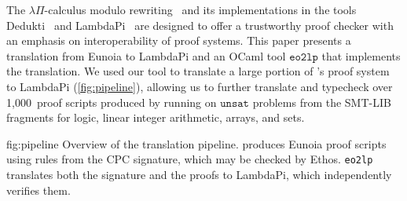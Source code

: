 \documentclass[class=llncs, crop=false]{standalone}
\begin{document}
The $\lambda\Pi$-calculus modulo rewriting~\cite{CousineauDowek}
and its implementations in the tools Dedukti~\cite{assaf2023dedukti}
and LambdaPi~\cite{hondet:hal-02981561} are designed to
offer a trustworthy proof checker with an emphasis on
interoperability of proof systems.
%
This paper presents a translation from Eunoia to LambdaPi
and an OCaml tool $\texttt{eo2lp}$ that implements the
translation.
%
We used our tool to translate a large portion of
's proof system to LambdaPi (\autoref{fig:pipeline}),
allowing us to further translate and typecheck
over 1{,}000~proof scripts produced by running 
on $\texttt{unsat}$ problems from the SMT-LIB fragments for logic,
linear integer arithmetic, arrays, and sets.
\begin{boxfigure}[t!]{fig:pipeline}
	{{Overview of the translation pipeline.
				 produces Eunoia proof scripts using rules
				from the CPC signature, which may be checked by Ethos.
				\texttt{eo2lp} translates both the signature and the proofs
				to LambdaPi, which independently verifies them.}}
	\centering
\end{boxfigure}

\end{document}
